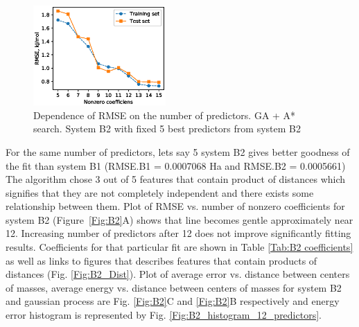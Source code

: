 \documentclass[aps,prl,reprint,amsmath,amssymb,nature]{revtex4-1}
\begin{document}
\begin{figure}
\includegraphics[width=0.45\textwidth]{media/B2_VIP_GA_PATH_RMSE.eps}
\caption{Dependence of RMSE on the number of predictors. GA + A* search. System B2 with fixed 5 best predictors from system B2}\label{Fig:B2_VIP_RMSE}
\end{figure}


For the same number of predictors, lets say 5 system B2 gives better goodness of the fit than system B1 (RMSE.B1 = 0.0007068 Ha and RMSE.B2 = 0.0005661)   
The algorithm chose 3 out of 5 features that contain product of distances which signifies that they are not completely independent and there exists some relationship between them. Plot of RMSE vs. number of nonzero coefficients for system B2 (Figure~\ref{Fig:B2}A) shows that line becomes gentle approximately near 12. Increasing number of predictors after 12 does not improve significantly fitting results. Coefficients for that particular fit are shown in Table \ref{Tab:B2 coefficients} as well as links to figures that describes features that contain products of distances (Fig. \ref{Fig:B2_Dist}). Plot of average error vs. distance between centers of masses, average energy vs. distance between centers of masses for system B2 and gaussian process are Fig. \ref{Fig:B2}C and \ref{Fig:B2}B respectively and energy error histogram is represented by Fig. \ref{Fig:B2_histogram_12_predictors}.
\end{document}

